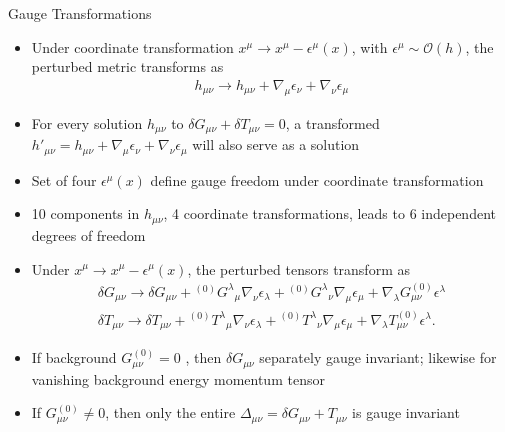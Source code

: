 \documentclass[8pt]{beamer}
\begin{document}
\begin{frame}{Gauge Transformations}
	\begin{itemize}
		\item 	Under coordinate transformation $x^\mu \to x^\mu - \epsilon^\mu(x)$, with $\epsilon^\mu \sim \mathcal O(h)$, the perturbed metric transforms as
			\begin{eqnarray*}
				h_{\mu\nu} \to h_{\mu\nu} + \nabla_\mu \epsilon_\nu + \nabla_\nu \epsilon_\mu
			\end{eqnarray*}
		\item 	For every solution $h_{\mu\nu}$ to $\delta G_{\mu\nu} + \delta T_{\mu\nu} = 0$, a transformed $h'_{\mu\nu} = h_{\mu\nu} + \nabla_\mu \epsilon_\nu + \nabla_\nu \epsilon_\mu$ will also serve as a solution
		\item Set of four $\epsilon^\mu(x)$ define gauge freedom under coordinate transformation
		\item 10 components in $h_{\mu\nu}$, 4 coordinate transformations, leads to 6 independent degrees of freedom
		\item Under $x^\mu \to x^\mu - \epsilon^\mu(x)$, the perturbed tensors transform as
			\begin{eqnarray*}
				\delta G_{\mu\nu} \to \delta G_{\mu\nu} + {}^{(0)}G^\lambda{}_\mu \nabla_\nu \epsilon_\lambda +  {}^{(0)}G^{\lambda}{}_{\nu}\nabla_\mu \epsilon_\mu + \nabla_\lambda  G^{(0)}_{\mu\nu} \epsilon^\lambda
				\nonumber\\
				\delta T_{\mu\nu} \to \delta T_{\mu\nu} + {}^{(0)}T^\lambda{}_\mu \nabla_\nu \epsilon_\lambda +  {}^{(0)}T^{\lambda}{}_{\nu}\nabla_\mu \epsilon_\mu + \nabla_\lambda  T^{(0)}_{\mu\nu} \epsilon^\lambda.
			\end{eqnarray*}
		\item If background $G_{\mu\nu}^{(0)} = 0$ , then $\delta G_{\mu\nu}$ separately gauge invariant; likewise for vanishing background energy momentum tensor
		\item If $G_{\mu\nu}^{(0)} \ne 0$, then only the entire $\Delta_{\mu\nu} = \delta G_{\mu\nu} + T_{\mu\nu}$ is gauge invariant
	\end{itemize}


\end{frame}

\end{document}
